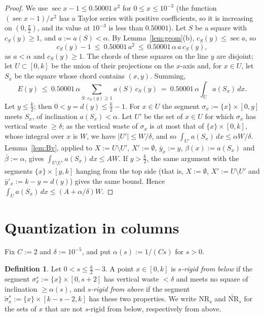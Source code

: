 \documentclass[11pt]{amsart}
\theoremstyle{definition}
\newtheorem{definition}[theorem]{Definition}
\theoremstyle{remark}
\begin{document}
\begin{proof}
We use $\sec x-1\le0.50001\,x^2$ for $0\le x\le10^{-3}$ (the function $(\sec x-1)/x^2$ has a Taylor series with positive
coefficients, so it is increasing on $(0,\frac\pi2)$, and its value at $10^{-3}$ is less than $0.50001$). Let $S$ be a square with
$c_S(y)\ge1$, and $a:=a(S)<\alpha$. By Lemma~\ref{lem:geom}(b), $c_S(y)\le\sec a$, so
\[
c_S(y)-1\ \le\ 0.50001\,a^2\ \le\ 0.50001\,\alpha\,a\,c_S(y),
\]
as $a<\alpha$ and $c_S(y)\ge1$. The chords of these squares on the line $y$ are disjoint; let $U\subset[0,k]$ be the union of their
projections on the $x$-axis and, for $x\in U$, let $S_x$ be the square whose chord contains $(x,y)$. Summing,
\[
E(y)\ \le\ 0.50001\,\alpha\sum_{S:\,c_S(y)\ge1}a(S)\,c_S(y)\ =\ 0.50001\,\alpha\int_Ua(S_x)\,dx .
\]
Let $y\le\frac k2$; then $0<y=d(y)\le\frac k2-1$. For $x\in U$ the segment $\sigma_x:=\{x\}\times[0,y]$ meets $S_x$, of inclination
$a(S_x)<\alpha$. Let $U'$ be the set of $x\in U$ for which $\sigma_x$ has vertical waste $\ge\delta$; as the vertical waste of
$\sigma_x$ is at most that of $\{x\}\times[0,k]$, whose integral over $x$ is $W$, we have $|U'|\le W/\delta$, and so
$\int_{U'}a(S_x)\,dx\le\alpha W/\delta$. Lemma~\ref{lem:Bv}, applied to $X:=U\setminus U'$, $X':=\emptyset$, $\bar y_x:=y$, $\beta(x):=a(S_x)$
and $\bar\beta:=\alpha$, gives $\int_{U\setminus U'}a(S_x)\,dx\le AW$. If $y>\frac k2$, the same argument with the segments
$\{x\}\times[y,k]$ hanging from the top side (that is, $X:=\emptyset$, $X':=U\setminus U'$ and $\bar y'_x:=k-y=d(y)$) gives the same bound.
Hence $\int_Ua(S_x)\,dx\le(A+\alpha/\delta)W$.
\end{proof}

\section{Quantization in columns}

Fix $C:=2$ and $\delta:=10^{-5}$, and put $\alpha(s):=1/(Cs)$ for $s>0$.

\begin{definition}
Let $0<s\le\frac k2-3$. A point $x\in[0,k]$ is \emph{$s$-rigid from below} if the segment
$\sigma^s_x:=\{x\}\times[0,s+2]$ has vertical waste $<\delta$ and meets no square of inclination $\ge\alpha(s)$, and
\emph{$s$-rigid from above} if the segment $\tilde\sigma^s_x:=\{x\}\times[k-s-2,k]$ has these two properties.
We write $\mathrm{NR}_s$ and $\widetilde{\mathrm{NR}}_s$ for the sets of $x$ that are not $s$-rigid from below, respectively
from above.
\end{definition}
\end{document}
